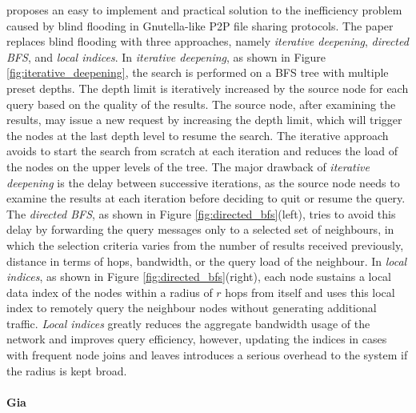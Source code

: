 \documentclass[acmcsur,acmnow]{acmtrans2m}
\begin{document}
\cite{yang_improvep2psearch_2002} proposes an easy to implement and practical
solution to the inefficiency problem caused by blind flooding in Gnutella-like
P2P file sharing protocols. The paper replaces blind flooding with three
approaches, namely \textit{iterative deepening}, \textit{directed BFS}, and
\textit{local indices}. In \textit{iterative deepening}, as shown in Figure \ref{fig:iterative_deepening},
the search is performed
on a BFS tree with multiple preset depths. The depth limit is iteratively
increased by the source node for each query based on the quality of the results.
The source node, after examining the results, may issue a new request by
increasing the depth limit, which will trigger the nodes at the last depth
level to resume the search. The iterative approach avoids to start the search
from scratch at each iteration and reduces the load of the nodes on the upper
levels of the tree. The major drawback of \textit{iterative deepening} is the
delay between successive iterations, as the source node needs to examine the
results at each iteration before deciding to quit or resume the query.  The
\textit{directed BFS}, as shown in Figure \ref{fig:directed_bfs}(left), tries to avoid this delay by forwarding the query messages
only to a selected set of neighbours, in which the selection criteria varies
from the number of results received previously, distance in terms of hops,
bandwidth, or the query load of the neighbour. In \textit{local indices}, as shown in Figure \ref{fig:directed_bfs}(right), each
node sustains a local data index of the nodes within a radius of $r$ hops from
itself and uses this local index to remotely query the neighbour nodes without
generating additional traffic.  \textit{Local indices} greatly reduces the
aggregate bandwidth usage of the network and improves query efficiency, however,
updating the indices in cases with frequent node joins and leaves introduces a
serious overhead to the system if the radius is kept broad.

\paragraph*{\bf Gia}
\end{document}
